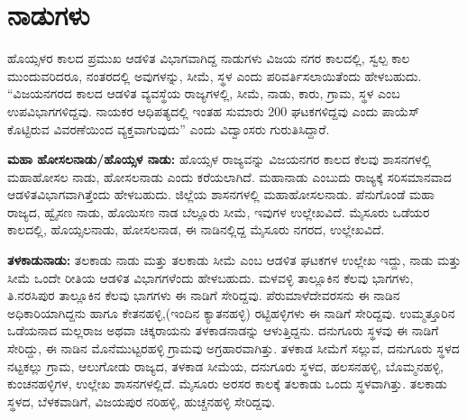 \section*{ನಾಡುಗಳು}

ಹೊಯ್ಸಳರ ಕಾಲದ ಪ್ರಮುಖ ಆಡಳಿತ ವಿಭಾಗವಾಗಿದ್ದ ನಾಡುಗಳು ವಿಜಯ ನಗರ ಕಾಲದಲ್ಲಿ, ಸ್ವಲ್ಪ ಕಾಲ ಮುಂದುವರಿದರೂ, ನಂತರದಲ್ಲಿ ಅವುಗಳನ್ನು, ಸೀಮೆ, ಸ್ಥಳ ಎಂದು ಪರಿವರ್ತಿಸಲಾಯಿತೆಂದು ಹೇಳಬಹುದು. “ವಿಜಯನಗರದ ಕಾಲದ ಆಡಳಿತ ವ್ಯವಸ್ಥೆಯ ರಾಜ್ಯಗಳಲ್ಲಿ, ಸೀಮೆ, ನಾಡು, ಕಾರು, ಗ್ರಾಮ, ಸ್ಥಳ ಎಂಬ ಉಪವಿಭಾಗಗಳಿದ್ದವು. ನಾಯಕರ ಆಧಿಪತ್ಯದಲ್ಲಿ ಇಂತಹ ಸುಮಾರು 200 ಘಟಕಗಳಿದ್ದವು ಎಂದು ಪಾಯೆಸ್​ ಕೊಟ್ಟಿರುವ ವಿವರಣೆಯಿಂದ ವ್ಯಕ್ತವಾಗುವುದು” ಎಂದು ವಿದ್ವಾಂಸರು ಗುರುತಿಸಿದ್ದಾರೆ.

\textbf{ಮಹಾ ಹೋಸಲನಾಡು/ಹೊಯ್ಸಳ ನಾಡು:} ಹೊಯ್ಸಳ ರಾಜ್ಯವನ್ನು ವಿಜಯನಗರ ಕಾಲದ ಕೆಲವು ಶಾಸನಗಳಲ್ಲಿ ಮಹಾಹೋಸಲ ನಾಡು, ಹೋಸಲನಾಡು ಎಂದು ಕರೆಯಲಾಗಿದೆ. ಮಹಾನಾಡು ಎಂಬುದು ರಾಜ್ಯಕ್ಕೆ ಸರಿಸಮಾನವಾದ ಆಡಳಿತವಿಭಾಗವಾಗಿತ್ತೆಂದು ಹೇಳಬಹುದು. ಜಿಲ್ಲೆಯ ಶಾಸನಗಳಲ್ಲಿ ಮಹಾಹೋಸಲನಾಡು. ಪೆನುಗೊಂಡೆ ಮಹಾ ರಾಜ್ಯದ, ಹ್ವೈಸಣ ನಾಡು, ಹೊಯಿಸಣ ನಾಡ ಬೆಲ್ಲೂರು ಸೀಮೆ, ಇವುಗಳ ಉಲ್ಲೇಖವಿದೆ. ಮೈಸೂರು ಒಡೆಯರ ಕಾಲದಲ್ಲಿ, ಹೊಯ್ಸಲನಾಡು, ಹೋಸಲನಾಡ, ಈ ನಾಡಿನಲ್ಲಿದ್ದ ಮೈಸೂರು ನಗರದ, ಉಲ್ಲೇಖವಿದೆ.

\textbf{ತಳಕಾಡುನಾಡು:} ತಲಕಾಡು ನಾಡು ಮತ್ತು ತಲಕಾಡು ಸೀಮೆ ಎಂಬ ಆಡಳಿತ ಘಟಕಗಳ ಉಲ್ಲೇಖ ಇದ್ದು, ನಾಡು ಮತ್ತು ಸೀಮೆ ಒಂದೇ ರೀತಿಯ ಆಡಳಿತ ವಿಭಾಗಗಳೆಂದು ಹೇಳಬಹುದು. ಮಳವಳ್ಳಿ ತಾಲ್ಲೂಕಿನ ಕೆಲವು ಭಾಗಗಳು, ತಿ.ನರಸಿಪುರ ತಾಲ್ಲೂಕಿನ ಕೆಲವು ಭಾಗಗಳು ಈ ನಾಡಿಗೆ ಸೇರಿದ್ದವು. ಪೆರುಮಾಳೆದೇವರಸನು ಈ ನಾಡಿನ ಅಧಿಕಾರಿಯಾಗಿದ್ದನು ಹಾಗೂ ಕೇತನಹಳ್ಳಿ,(ಇಂದಿನ ಕ್ಯಾತನಹಳ್ಳಿ) ರಟ್ಟಿಹಳ್ಳಿಗಳು ಈ ನಾಡಿಗೆ ಸೇರಿದ್ದವು. ಉಮ್ಮತ್ತೂರಿನ ಒಡೆಯನಾದ ಮಲ್ಲರಾಜ ಅಥವಾ ಚಿಕ್ಕರಾಯನು ತಳಕಾಡನಾಡನ್ನು ಆಳುತ್ತಿದ್ದನು. ದನುಗೂರು ಸ್ಥಳವು ಈ ನಾಡಿಗೆ ಸೇರಿದ್ದು, ಈ ನಾಡಿನ ಮೊನೆಮುಟ್ಟರಹಳ್ಳಿ ಗ್ರಾಮವು ಅಗ್ರಹಾರವಾಗಿತ್ತು. ತಳಕಾಡ ಸೀಮೆಗೆ ಸಲ್ಲುವ, ದನುಗೂರು ಸ್ಥಳದ ನಟ್ಟಕಲ್ಲು ಗ್ರಾಮ, ಆಲುಗೋಡು ರಾಜ್ಯದ, ತಳಕಾಡ ಸೀಮೆಯ, ದನುಗೂರು ಸ್ಥಳದ, ಹಲಸನಹಳ್ಳಿ, ಬೊಮ್ಮನಹಳ್ಳಿ, ಕುಂಚನಹಳ್ಳಿಗಳ, ಉಲ್ಲೇಖ ಶಾಸನಗಳಲ್ಲಿದೆ. ಮೈಸೂರು ಅರಸರ ಕಾಲಕ್ಕೆ ತಲಕಾಡು ಒಂದು ಸ್ಥಳವಾಗಿತ್ತು. ತಲಕಾಡು ಸ್ಥಳದ, ಬೆಳಕವಾಡಿಗೆ, ವಿಜಯಪುರ ನರಿಹಳ್ಳಿ, ಹುಚ್ಚನಹಳ್ಳಿ ಸೇರಿದ್ದವು.

